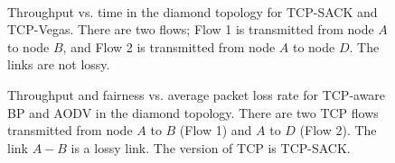 \documentclass[conference]{IEEEtran}
\begin{document}
\begin{figure}[t!]
\vspace{-0pt}
\begin{center}
 \hspace{-0pt} \\
 \hspace{-0pt}
\end{center}
\begin{center}
\vspace{-5pt}
\caption{\label{fig:diamond_thrpt_time_results} \scriptsize Throughput vs. time in the diamond topology for TCP-SACK and TCP-Vegas. There are two flows; Flow 1 is transmitted from node $A$ to node $B$, and Flow 2 is transmitted from node $A$ to node $D$. The links are not lossy.
}
\vspace{-15pt}
\end{center}
\end{figure}


\begin{figure}[t!]
\vspace{-0pt}
\begin{center}
\end{center}
\begin{center}
\vspace{-5pt}
\caption{\label{fig:diamond_thrpt_vs_loss_sack} \scriptsize Throughput and fairness vs. average packet loss rate for TCP-aware BP and AODV in the diamond topology. There are two TCP flows transmitted from node $A$ to $B$ (Flow 1) and $A$ to $D$ (Flow 2). The link $A-B$ is a lossy link. The version of TCP is TCP-SACK.}
\end{center}
\vspace{-15pt}
\end{figure}
\end{document}
